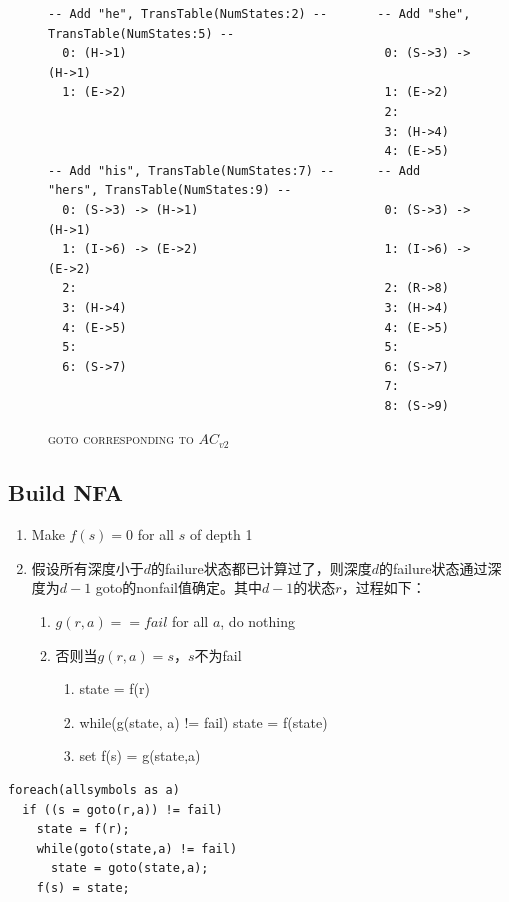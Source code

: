 \documentclass{article}
\begin{document}
\begin{figure}[h]
  \centering
\caption{\textsc{goto corresponding to $AC_{v2}$}}
\begin{verbatim}
-- Add "he", TransTable(NumStates:2) --       -- Add "she", TransTable(NumStates:5) --
  0: (H->1)                                    0: (S->3) -> (H->1)
  1: (E->2)                                    1: (E->2)
                                               2:
                                               3: (H->4)
                                               4: (E->5)
-- Add "his", TransTable(NumStates:7) --      -- Add "hers", TransTable(NumStates:9) --
  0: (S->3) -> (H->1)                          0: (S->3) -> (H->1)
  1: (I->6) -> (E->2)                          1: (I->6) -> (E->2)
  2:                                           2: (R->8)
  3: (H->4)                                    3: (H->4)
  4: (E->5)                                    4: (E->5)
  5:                                           5:
  6: (S->7)                                    6: (S->7)
                                               7:
                                               8: (S->9)
\end{verbatim}
\end{figure}

\subsection{Build NFA}
\begin{enumerate}
  \item Make $f(s) = 0$ for all $s$ of depth 1
  \item 假设所有深度小于$d$的failure状态都已计算过了，则深度$d$的failure状态通过深度为$d-1$ goto的nonfail值确定。其中$d-1$的状态$r$，过程如下：
 \begin{enumerate}
    \item $g(r,a) == fail$ for all $a$, do nothing
    \item 否则当$g(r, a) = s$，$s$不为fail
      \begin{enumerate}
        \item state = f(r)
        \item while(g(state, a) != fail) state = f(state)
        \item set f(s) = g(state,a)
      \end{enumerate}
 \end{enumerate}
\end{enumerate}

\begin{lstlisting}
foreach(allsymbols as a)
  if ((s = goto(r,a)) != fail)
    state = f(r);
    while(goto(state,a) != fail)
      state = goto(state,a);
    f(s) = state;
\end{lstlisting}
\end{document}
